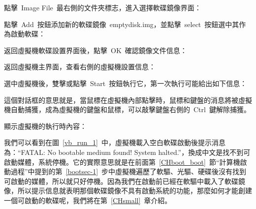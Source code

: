 點擊~Image File~最右側的文件夾標志，進入選擇軟碟鏡像界面：\\

點擊~Add~按鈕添加新的軟碟鏡像~emptydisk.img，並點擊~select~按鈕選中其作為啟動軟碟：\\

返回虛擬機軟碟設置界面後，點擊~OK~確認鏡像文件信息：\\

返回虛擬機主界面，查看右側的虛擬機設置信息：\\

選中虛擬機後，雙擊或點擊~Start~按鈕執行它，第一次執行可能給出如下信息：\\

這個對話框的意思就是，當鼠標在虛擬機內部點擊時，鼠標和鍵盤的消息將被虛擬機自動捕獲，成為虛擬機的鍵盤和鼠標，可以敲擊鍵盤右側的~Ctrl~鍵解除捕獲。

顯示虛擬機的執行時內容：\\

我們可以看到在圖~\ref{vb_run_1}~中，虛擬機載入空白軟碟啟動後提示消息為：“FATAL: No bootable medium found! System halted.”，換成中文是找不到可啟動媒體，系統停機。它的實際意思就是在前面第~\ref{CHboot_boot}~節“計算機啟動過程”中提到的第~\ref{bootsec-1}~步中虛擬機遍歷了軟驅、光驅、硬碟後沒有找到可啟動的媒體，所以就只好停機。因為我們在啟動前已經在軟驅中載入了軟碟鏡像，所以提示信息就表明那個軟碟鏡像不具有啟動系統的功能，那麼如何才能創建一個可啟動的軟碟呢，我們將在第~\ref{CHsmall}~章介紹。

